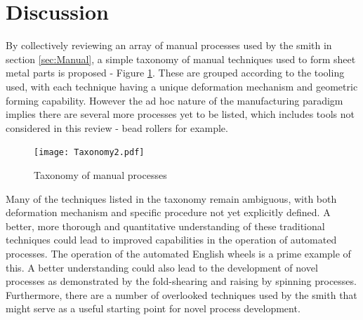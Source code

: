 



\section{Discussion}

By collectively reviewing an array of manual processes used by the smith in section \ref{sec:Manual}, a simple taxonomy of manual techniques used to form sheet metal parts is proposed - Figure \ref{fig:ManualTaxonomy}. These are grouped according to the tooling used, with each technique having a unique deformation mechanism and geometric forming capability. However the ad hoc nature of the manufacturing paradigm implies there are several more processes yet to be listed, which includes tools not considered in this review - bead rollers for example.

\begin{figure}[h]
	\centering
    \texttt{[image: Taxonomy2.pdf]}
    \caption{Taxonomy of manual processes}
    \label{fig:ManualTaxonomy}
\end{figure}

Many of the techniques listed in the taxonomy remain ambiguous, with both deformation mechanism and specific procedure not yet explicitly defined. A better, more thorough and quantitative understanding of these traditional techniques could lead to improved capabilities in the operation of automated processes. The operation of the automated English wheels is a prime example of this. A better understanding could also lead to the development of novel processes as demonstrated by the fold-shearing and raising by spinning processes. Furthermore, there are a number of overlooked techniques used by the smith that might serve as a useful starting point for novel process development. 

